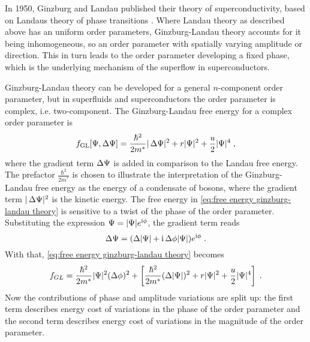 \documentclass[../notes.tex]{subfiles}
\begin{document}
In 1950, Ginzburg and Landau published their theory of superconductivity, based on Landaus theory of phase transitions \cite{ginzburgTheorySuperconductivity1950}.
Where Landau theory as described above has an uniform order parameters, Ginzburg-Landau theory accounts for it being inhomogeneous, so an order parameter with spatially varying amplitude or direction.
This in turn leads to the order parameter developing a fixed phase, which is the underlying mechanism of the superflow in superconductors.

Ginzburg-Landau theory can be developed for a general \(n\)-component order parameter, but in superfluids and superconductors the order parameter is complex, i.e. two-component.
The Ginzburg-Landau free energy for a complex order parameter is
\begin{equation}
	f_{\mathrm{GL}} [\Psi, \adif{\Psi}] = \frac{\hbar^2}{2m^*} \vert \adif{\Psi} \vert^2 + r \vert \Psi \vert^2 + \frac{u}{2} \vert \Psi \vert^4 \;,
	\label{eq:free energy ginzburg-landau theory}
\end{equation}
where the gradient term \(\adif{\Psi}\) is added in comparison to the Landau free energy.
The prefactor \(\frac{\hbar^2}{2m^*}\) is chosen to illustrate the interpretation of the Ginzburg-Landau free energy as the energy of a condensate of bosons, where the gradient term \(\vert \adif{\Psi} \vert^2\) is the kinetic energy.
The free energy in \cref{eq:free energy ginzburg-landau theory} is sensitive to a twist of the phase of the order parameter.
Substituting the expression \(\Psi = \vert \Psi \vert e^{\mathrm{i} \phi}\), the gradient term reads
\begin{equation}
	\Delta \Psi = (\adif{\vert \Psi \vert} + \iu \adif{\phi} \vert \Psi \vert) e^{\iu \phi} \;.
\end{equation}
With that, \cref{eq:free energy ginzburg-landau theory} becomes
\begin{equation}
	f_{GL}  = \frac{\hbar^2}{2m^*} \vert \Psi \vert^2 (\adif{\phi})^2 + \left[ \frac{\hbar^2}{2m^*} (\adif{\vert \Psi \vert})^2 + r \vert \Psi \vert^2 + \frac{u}{2} \vert \Psi \vert^4 \right] \;.
	\label{eq:free energy ginzburg-landau theory with phase}
\end{equation}
Now the contributions of phase and amplitude variations are split up: the first term describes energy cost of variations in the phase of the order parameter and the second term describes energy cost of variations in the magnitude of the order parameter.
\end{document}
